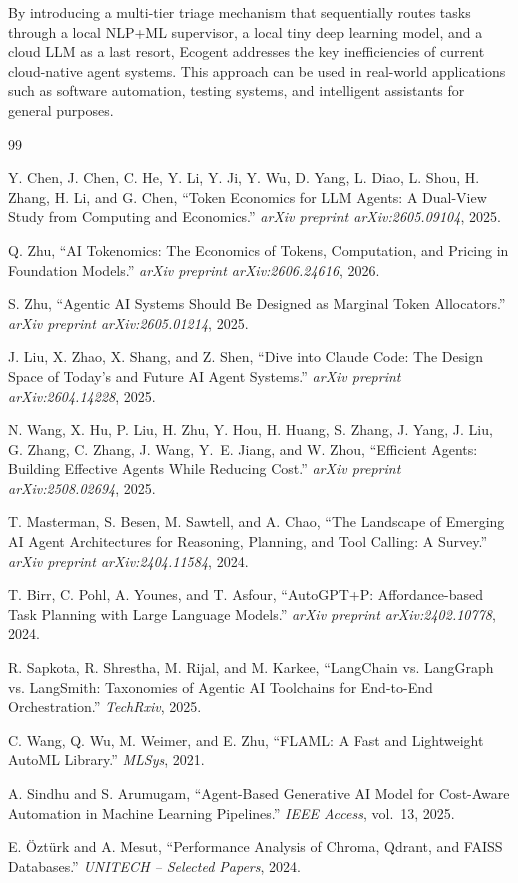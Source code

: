 \documentclass[12pt,a4paper]{article}
\begin{document}
\noindent By introducing a multi-tier triage mechanism that sequentially routes tasks through a local NLP+ML supervisor, a local tiny deep learning model, and a cloud LLM as a last resort, Ecogent addresses the key inefficiencies of current cloud-native agent systems. This approach can be used in real-world applications such as software automation, testing systems, and intelligent assistants for general purposes.

\begin{thebibliography}{99}

Y. Chen, J. Chen, C. He, Y. Li, Y. Ji, Y. Wu, D. Yang, L. Diao, L. Shou, H. Zhang, H. Li, and G. Chen, ``Token Economics for LLM Agents: A Dual-View Study from Computing and Economics.'' \textit{arXiv preprint arXiv:2605.09104}, 2025.

Q. Zhu, ``AI Tokenomics: The Economics of Tokens, Computation, and Pricing in Foundation Models.'' \textit{arXiv preprint arXiv:2606.24616}, 2026.

S. Zhu, ``Agentic AI Systems Should Be Designed as Marginal Token Allocators.'' \textit{arXiv preprint arXiv:2605.01214}, 2025.

J. Liu, X. Zhao, X. Shang, and Z. Shen, ``Dive into Claude Code: The Design Space of Today's and Future AI Agent Systems.'' \textit{arXiv preprint arXiv:2604.14228}, 2025.

N. Wang, X. Hu, P. Liu, H. Zhu, Y. Hou, H. Huang, S. Zhang, J. Yang, J. Liu, G. Zhang, C. Zhang, J. Wang, Y.~E. Jiang, and W. Zhou, ``Efficient Agents: Building Effective Agents While Reducing Cost.'' \textit{arXiv preprint arXiv:2508.02694}, 2025.

T. Masterman, S. Besen, M. Sawtell, and A. Chao, ``The Landscape of Emerging AI Agent Architectures for Reasoning, Planning, and Tool Calling: A Survey.'' \textit{arXiv preprint arXiv:2404.11584}, 2024.

T. Birr, C. Pohl, A. Younes, and T. Asfour, ``AutoGPT+P: Affordance-based Task Planning with Large Language Models.'' \textit{arXiv preprint arXiv:2402.10778}, 2024.

R. Sapkota, R. Shrestha, M. Rijal, and M. Karkee, ``LangChain vs. LangGraph vs. LangSmith: Taxonomies of Agentic AI Toolchains for End-to-End Orchestration.'' \textit{TechRxiv}, 2025.

C. Wang, Q. Wu, M. Weimer, and E. Zhu, ``FLAML: A Fast and Lightweight AutoML Library.'' \textit{MLSys}, 2021.

A. Sindhu and S. Arumugam, ``Agent-Based Generative AI Model for Cost-Aware Automation in Machine Learning Pipelines.'' \textit{IEEE Access}, vol.~13, 2025.

E. \"{O}zt\"{u}rk and A. Mesut, ``Performance Analysis of Chroma, Qdrant, and FAISS Databases.'' \textit{UNITECH -- Selected Papers}, 2024.

\end{thebibliography}
\end{document}

